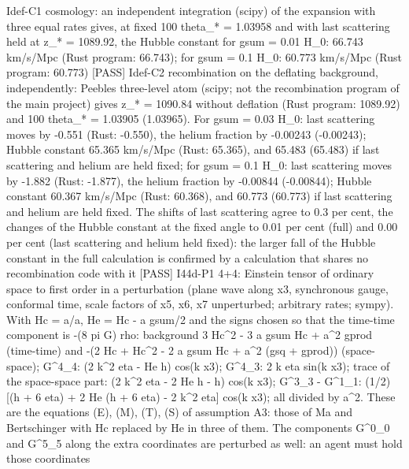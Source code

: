 \documentclass[
  10pt,
]{article}
\newenvironment{Shaded}{}{}
\newcommand{\NormalTok}[1]{#1}
\begin{document}
\begin{Shaded}
\begin{Highlighting}[]
\NormalTok{[PASS] Idef{-}C1  cosmology: an independent integration (scipy) of the expansion with three equal rates gives, at fixed 100 theta\_* = 1.03958 and with last scattering held at z\_* = 1089.92, the Hubble constant for gsum = 0.01 H\_0: 66.743 km/s/Mpc (Rust program: 66.743); for gsum = 0.1 H\_0: 60.773 km/s/Mpc (Rust program: 60.773)}
\NormalTok{[PASS] Idef{-}C2  recombination on the deflating background, independently: Peebles\textquotesingle{} three{-}level atom (scipy; not the recombination program of the main project) gives z\_* = 1090.84 without deflation (Rust program: 1089.92) and 100 theta\_* = 1.03905 (1.03965). For gsum = 0.03 H\_0: last scattering moves by {-}0.551 (Rust: {-}0.550), the helium fraction by {-}0.00243 ({-}0.00243); Hubble constant 65.365 km/s/Mpc (Rust: 65.365), and 65.483 (65.483) if last scattering and helium are held fixed; for gsum = 0.1 H\_0: last scattering moves by {-}1.882 (Rust: {-}1.877), the helium fraction by {-}0.00844 ({-}0.00844); Hubble constant 60.367 km/s/Mpc (Rust: 60.368), and 60.773 (60.773) if last scattering and helium are held fixed. The shifts of last scattering agree to 0.3 per cent, the changes of the Hubble constant at the fixed angle to 0.01 per cent (full) and 0.00 per cent (last scattering and helium held fixed): the larger fall of the Hubble constant in the full calculation is confirmed by a calculation that shares no recombination code with it}
\NormalTok{[PASS] I44d{-}P1  4+4: Einstein tensor of ordinary space to first order in a perturbation (plane wave along x3, synchronous gauge, conformal time, scale factors of x5, x6, x7 unperturbed; arbitrary rates; sympy). With Hc = a\textquotesingle{}/a, He = Hc {-} a gsum/2 and the signs chosen so that the time{-}time component is {-}(8 pi G) rho: background 3 Hc\^{}2 {-} 3 a gsum Hc + a\^{}2 gprod (time{-}time) and {-}(2 Hc\textquotesingle{} + Hc\^{}2 {-} 2 a gsum Hc + a\^{}2 (gsq + gprod)) (space{-}space); G\^{}4\_4: (2 k\^{}2 eta {-} He h\textquotesingle{}) cos(k x3); G\^{}4\_3: 2 k eta\textquotesingle{} sin(k x3); trace of the space{-}space part: (2 k\^{}2 eta {-} 2 He h\textquotesingle{} {-} h\textquotesingle{}\textquotesingle{}) cos(k x3); G\^{}3\_3 {-} G\^{}1\_1: (1/2)[(h\textquotesingle{}\textquotesingle{} + 6 eta\textquotesingle{}\textquotesingle{}) + 2 He (h\textquotesingle{} + 6 eta\textquotesingle{}) {-} 2 k\^{}2 eta] cos(k x3); all divided by a\^{}2. These are the equations (E), (M), (T), (S) of assumption A3: those of Ma and Bertschinger with Hc replaced by He in three of them. The components G\^{}0\_0 and G\^{}5\_5 along the extra coordinates are perturbed as well: an agent must hold those coordinates}

\end{Highlighting}
\end{Shaded}
\end{document}
